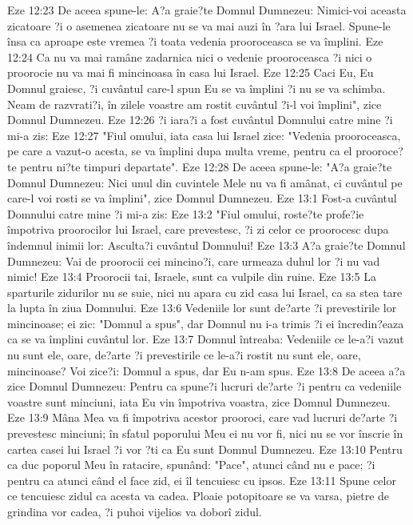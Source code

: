 Eze 12:23  De aceea spune-le: A?a graie?te Domnul Dumnezeu: Nimici-voi aceasta zicatoare ?i o asemenea zicatoare nu se va mai auzi în ?ara lui Israel. Spune-le însa ca aproape este vremea ?i toata vedenia prooroceasca se va împlini.
Eze 12:24  Ca nu va mai ramâne zadarnica nici o vedenie prooroceasca ?i nici o proorocie nu va mai fi mincinoasa în casa lui Israel.
Eze 12:25  Caci Eu, Eu Domnul graiesc, ?i cuvântul care-l spun Eu se va împlini ?i nu se va schimba. Neam de razvrati?i, în zilele voastre am rostit cuvântul ?i-l voi împlini", zice Domnul Dumnezeu.
Eze 12:26  ?i iara?i a fost cuvântul Domnului catre mine ?i mi-a zis:
Eze 12:27  "Fiul omului, iata casa lui Israel zice: "Vedenia prooroceasca, pe care a vazut-o acesta, se va împlini dupa multa vreme, pentru ca el prooroce?te pentru ni?te timpuri departate".
Eze 12:28  De aceea spune-le: "A?a graie?te Domnul Dumnezeu: Nici unul din cuvintele Mele nu va fi amânat, ci cuvântul pe care-l voi rosti se va împlini", zice Domnul Dumnezeu.
Eze 13:1  Fost-a cuvântul Domnului catre mine ?i mi-a zis:
Eze 13:2  "Fiul omului, roste?te profe?ie împotriva proorocilor lui Israel, care prevestesc, ?i zi celor ce proorocesc dupa îndemnul inimii lor: Asculta?i cuvântul Domnului!
Eze 13:3  A?a graie?te Domnul Dumnezeu: Vai de proorocii cei mincino?i, care urmeaza duhul lor ?i nu vad nimic!
Eze 13:4  Proorocii tai, Israele, sunt ca vulpile din ruine.
Eze 13:5  La sparturile zidurilor nu se suie, nici nu apara cu zid casa lui Israel, ca sa stea tare la lupta în ziua Domnului.
Eze 13:6  Vedeniile lor sunt de?arte ?i prevestirile lor mincinoase; ei zic: "Domnul a spus", dar Domnul nu i-a trimis ?i ei încredin?eaza ca se va împlini cuvântul lor.
Eze 13:7  Domnul întreaba: Vedeniile ce le-a?i vazut nu sunt ele, oare, de?arte ?i prevestirile ce le-a?i rostit nu sunt ele, oare, mincinoase? Voi zice?i: Domnul a spus, dar Eu n-am spus.
Eze 13:8  De aceea a?a zice Domnul Dumnezeu: Pentru ca spune?i lucruri de?arte ?i pentru ca vedeniile voastre sunt minciuni, iata Eu vin împotriva voastra, zice Domnul Dumnezeu.
Eze 13:9  Mâna Mea va fi împotriva acestor prooroci, care vad lucruri de?arte ?i prevestesc minciuni; în sfatul poporului Meu ei nu vor fi, nici nu se vor înscrie în cartea casei lui Israel ?i vor ?ti ca Eu sunt Domnul Dumnezeu.
Eze 13:10  Pentru ca duc poporul Meu în ratacire, spunând: "Pace", atunci când nu e pace; ?i pentru ca atunci când el face zid, ei îl tencuiesc cu ipsos.
Eze 13:11  Spune celor ce tencuiesc zidul ca acesta va cadea. Ploaie potopitoare se va varsa, pietre de grindina vor cadea, ?i puhoi vijelios va doborî zidul.
